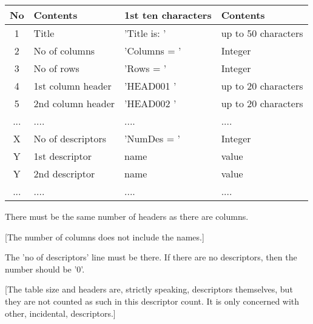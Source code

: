 {{\begin{tabular}{|c|l|l|l|}\hline 
   No & Contents          & 1st ten characters   &   Contents \\ \hline
   1  & Title             & 'Title is: '         &   up to 50 characters \\
   2  & No of columns     & 'Columns = '         &   Integer \\
   3  & No of rows        & 'Rows =    '         &   Integer \\
   4  & 1st column header & 'HEAD001   '         &   up to 20 characters \\
   5  & 2nd column header & 'HEAD002   '         &   up to 20 characters \\
 ...  &   ....            &     ....            &    .... \\
   X  & No of descriptors &  'NumDes =  '        &    Integer \\
   Y  & 1st descriptor   &  name                 &   value \\
   Y  & 2nd descriptor   &  name                 &   value \\
 ...  &   ....            &     ....            &    .... \\ \hline
\end{tabular}
                                                                               
   There must be the same number of headers as there are columns.
                                                                               
   [The number of columns does not include the names.]
                                                                               
   The 'no of descriptors' line must be there. If there are no
   descriptors, then the number should be '0'.
                                                                               
   [The table size and headers are, strictly speaking, descriptors
    themselves, but they are not counted as such in this
    descriptor count. It is only concerned with other, incidental,
    descriptors.]
                                                                               
}}
